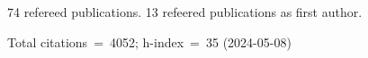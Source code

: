 74 refereed publications. 13 refeered publications as first author.

Total citations~=~4052; h-index~=~35 (2024-05-08)